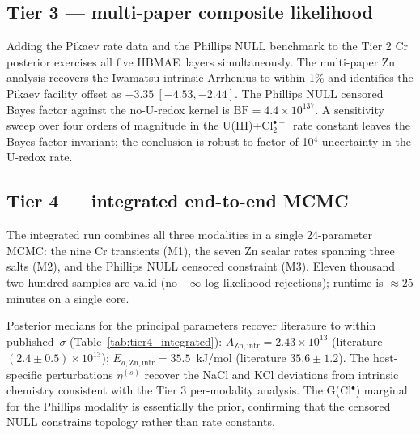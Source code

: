 \documentclass[12pt]{article}
\theoremstyle{plain}
\theoremstyle{definition}
\theoremstyle{remark}
\newcommand{\Clt}{\ensuremath{\mathrm{Cl}_2^{\bullet-}}\xspace}
\newcommand{\HBMAE}{HBMAE\xspace}
\begin{document}
\subsection{Tier 3 --- multi-paper composite likelihood}\label{sec:val:tier3}

Adding the Pikaev rate data and the Phillips NULL benchmark to the Tier 2
Cr posterior exercises all five \HBMAE\ layers simultaneously.  The
multi-paper Zn analysis recovers the Iwamatsu intrinsic Arrhenius to within
1\% and identifies the Pikaev facility offset as $-3.35\ [-4.53, -2.44]$.
The Phillips NULL censored Bayes factor against the no-U-redox kernel is
$\mathrm{BF} = 4.4\times 10^{137}$.  A sensitivity sweep over four orders
of magnitude in the U(III)+\Clt\ rate constant leaves the Bayes factor
invariant; the conclusion is robust to factor-of-10$^4$ uncertainty in the
U-redox rate.

\subsection{Tier 4 --- integrated end-to-end MCMC}\label{sec:val:tier4}

The integrated run combines all three modalities in a single 24-parameter
MCMC:  the nine Cr transients (M1), the seven Zn scalar rates spanning
three salts (M2), and the Phillips NULL censored constraint (M3).
Eleven thousand two hundred samples are valid (no $-\infty$ log-likelihood
rejections); runtime is $\approx 25$ minutes on a single core.

Posterior medians for the principal parameters recover literature to
within published~$\sigma$ (Table~\ref{tab:tier4_integrated}):
$A_{\mathrm{Zn,intr}} = 2.43\times 10^{13}$ (literature
$(2.4\pm 0.5)\times 10^{13}$);
$E_{a,\mathrm{Zn,intr}} = 35.5$~kJ/mol (literature $35.6\pm 1.2$).  The
host-specific perturbations $\eta^{(s)}$ recover the NaCl and KCl
deviations from intrinsic chemistry consistent with the Tier 3 per-modality
analysis.  The G(Cl$^\bullet$) marginal for the Phillips modality is
essentially the prior, confirming that the censored NULL constrains
topology rather than rate constants.
\end{document}
